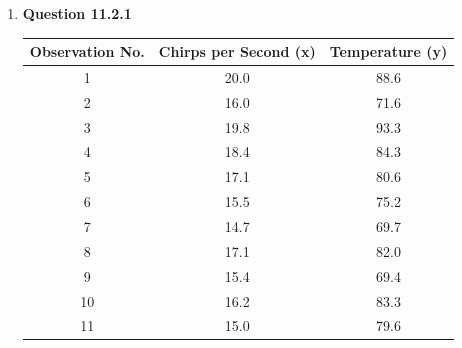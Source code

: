 \documentclass{uofa-eng-assignment}
\begin{document}
 \maketitle
\begin{enumerate}
    \item[]
        \textbf{Question 11.2.1} \\
        \begin{table}[ht]
            \centering
            \begin{tabular}{ccc}
                \hline
                Observation No. & Chirps per Second (x) & Temperature (y) \\
                \hline
                1               & 20.0                  & 88.6            \\
                2               & 16.0                  & 71.6            \\
                3               & 19.8                  & 93.3            \\
                4               & 18.4                  & 84.3            \\
                5               & 17.1                  & 80.6            \\
                6               & 15.5                  & 75.2            \\
                7               & 14.7                  & 69.7            \\
                8               & 17.1                  & 82.0            \\
                9               & 15.4                  & 69.4            \\
                10              & 16.2                  & 83.3            \\
                11              & 15.0                  & 79.6            \\

\end{tabular}
\end{table}
\end{enumerate}
\end{document}
